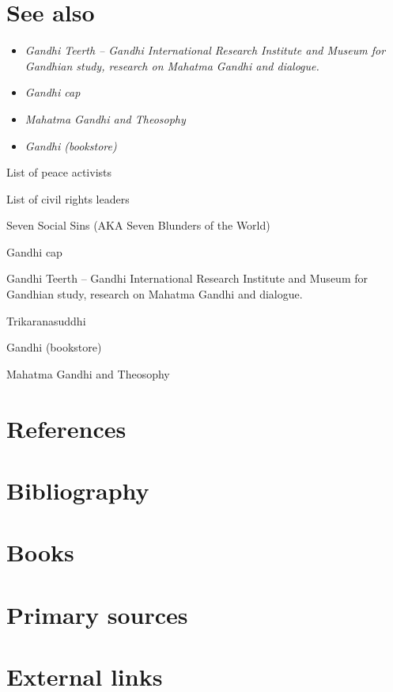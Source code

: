 \section{See also}\label{see-also}

\begin{itemize}
\item
  \emph{Gandhi Teerth -- Gandhi International Research Institute and
  Museum for Gandhian study, research on Mahatma Gandhi and dialogue.}
\item
  \emph{Gandhi cap}
\item
  \emph{Mahatma Gandhi and Theosophy}
\item
  \emph{Gandhi (bookstore)}
\end{itemize}

List of peace activists

List of civil rights leaders

Seven Social Sins (AKA Seven Blunders of the World)

Gandhi cap

Gandhi Teerth -- Gandhi International Research Institute and Museum for
Gandhian study, research on Mahatma Gandhi and dialogue.

Trikaranasuddhi

Gandhi (bookstore)

Mahatma Gandhi and Theosophy

\section{References}\label{references}

\section{Bibliography}\label{bibliography}

\section{Books}\label{books}

\section{Primary sources}\label{primary-sources}

\section{External links}\label{external-links}

